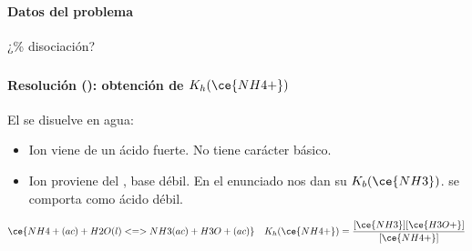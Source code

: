 
\begin{frame}
	\frametitle{\ejerciciocmd}
	\framesubtitle{Datos del problema}
	\begin{center}
		{\huge ¿\% disociación?}\\[.4cm]
		\quad
	\end{center}
\end{frame}

\begin{frame}
	\frametitle{\ejerciciocmd}
	\framesubtitle{Resolución (): obtención de $K_h(\ce{NH4+})$}
	\begin{center}
		El  se disuelve en agua:
	\end{center}
	\begin{itemize}
		\item Ion  viene de un ácido fuerte. No tiene carácter básico.
		\item Ion  proviene del , base débil. En el enunciado nos dan su $K_b(\ce{NH3})$.  se comporta como ácido débil.
	\end{itemize}
		$$
			\ce{NH4+(ac) + H2O(l) <=> NH3(ac) + H3O+(ac)}\quad
			K_h(\ce{NH4+}) = \frac{[\ce{NH3}][\ce{H3O+}]}{[\ce{NH4+}]}
		$$
\end{frame}

